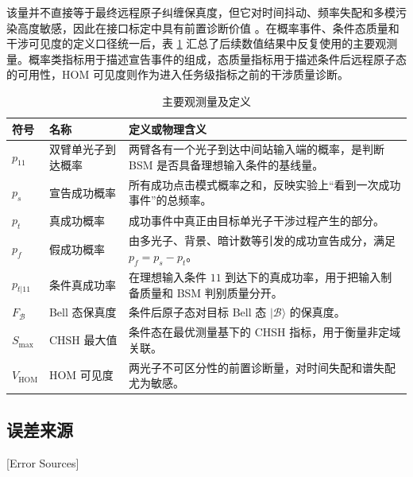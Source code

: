 该量并不直接等于最终远程原子纠缠保真度，但它对时间抖动、频率失配和多模污染高度敏感，因此在接口标定中具有前置诊断价值 \cite{HongOuMandel1987,vanleent2022entangling}。在概率事件、条件态质量和干涉可见度的定义口径统一后，表 \ref{tab:ch2-observables} 汇总了后续数值结果中反复使用的主要观测量。概率类指标用于描述宣告事件的组成，态质量指标用于描述条件后远程原子态的可用性，HOM 可见度则作为进入任务级指标之前的干涉质量诊断。
\begin{table}[htbp]
  
\centering
  
\caption{主要观测量及定义}
  
\label{tab:ch2-observables}
  
\begin{tabular}{p{2.2cm}p{3.0cm}p{8.8cm}}
    
\toprule
    符号 & 名称 & 定义或物理含义 \\
    
\midrule
    $p_{11}$ & 双臂单光子到达概率 & 两臂各有一个光子到达中间站输入端的概率，是判断 BSM 是否具备理想输入条件的基线量。\\
    $p_s$ & 宣告成功概率 & 所有成功点击模式概率之和，反映实验上“看到一次成功事件”的总频率。\\
    $p_t$ & 真成功概率 & 成功事件中真正由目标单光子干涉过程产生的部分。\\
    $p_f$ & 假成功概率 & 由多光子、背景、暗计数等引发的成功宣告成分，满足 $p_f=p_s-p_t$。\\
    $p_{t|11}$ & 条件真成功率 & 在理想输入条件 $11$ 到达下的真成功率，用于把输入制备质量和 BSM 判别质量分开。\\
    $F_{\mathcal B}$ & Bell 态保真度 & 条件后原子态对目标 Bell 态 $|\mathcal B\rangle$ 的保真度。\\
    $S_{\max}$ & CHSH 最大值 & 条件态在最优测量基下的 CHSH 指标，用于衡量非定域关联。\\
    $V_{\mathrm{HOM}}$ & HOM 可见度 & 两光子不可区分性的前置诊断量，对时间失配和谱失配尤为敏感。\\
    
\bottomrule
  
\end{tabular}
\end{table}


\subsection{误差来源}[Error Sources]

